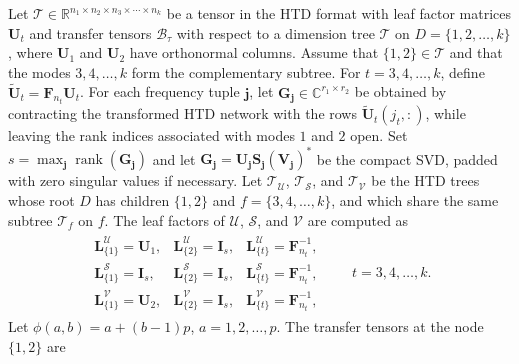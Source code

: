 \documentclass[onefignum,onetabnum]{siamart250211}
\begin{document}
\begin{proposition}
\label{thm:htd_kth_tsvd_core}
Let $\mathscr{T}\in\mathbb{R}^{n_1\times n_2\times n_3\times\cdots\times n_k}$ be a tensor in the HTD format with leaf factor matrices $\textbf{U}_t$ and
transfer tensors $\mathscr{B}_\tau$ with respect to a dimension tree
$\mathcal{T}$ on $D=\{1,2, \dots,k\}$, where $\textbf{U}_1$ and
$\textbf{U}_2$ have orthonormal columns. Assume that $\{1,2\}\in\mathcal{T}$ and that the modes $3, 4, \dots,k$ form the complementary subtree. For $t=3, 4, \dots,k$, define
$\widetilde{\textbf{U}}_t=\textbf{F}_{n_t}\textbf{U}_t$. For each frequency tuple
$\boldsymbol{j}$, let
$\textbf{G}_{\boldsymbol{j}}\in\mathbb{C}^{r_1\times r_2}$ be obtained by
contracting the transformed HTD network with the rows
$\widetilde{\textbf{U}}_t(j_t,:)$, while leaving the rank
indices associated with modes $1$ and $2$ open. Set
$s=\max_{\boldsymbol{j}}\operatorname{rank}(\textbf{G}_{\boldsymbol{j}})$ and let $\textbf{G}_{\boldsymbol{j}}
=
\textbf{U}_{\boldsymbol{j}}
\boldsymbol{S}_{\boldsymbol{j}}
(\textbf{V}_{\boldsymbol{j}})^*$
be the compact SVD, padded with zero singular values if necessary.
Let $\mathcal{T}_{\mathscr{U}}$, $\mathcal{T}_{\mathscr{S}}$, and
$\mathcal{T}_{\mathscr{V}}$ be the HTD trees whose root $D$ has children $\{1,2\}$ and $f=\{3,4,\dots,k\}$, and which share the same subtree $\mathcal{T}_f$ on $f$. The leaf factors of $\mathscr{U}$, $\mathscr{S}$, and
$\mathscr{V}$ are computed as
\begin{align*}
\begin{array}{lll}
\textbf{L}^{\mathscr{U}}_{\{1\}}=\textbf{U}_1, &
\textbf{L}^{\mathscr{U}}_{\{2\}}=\textbf{I}_s, &
\textbf{L}^{\mathscr{U}}_{\{t\}}=\textbf{F}_{n_t}^{-1}, \\
\textbf{L}^{\mathscr{S}}_{\{1\}}=\textbf{I}_s, &
\textbf{L}^{\mathscr{S}}_{\{2\}}=\textbf{I}_s, &
\textbf{L}^{\mathscr{S}}_{\{t\}}=\textbf{F}_{n_t}^{-1}, \\
\textbf{L}^{\mathscr{V}}_{\{1\}}=\textbf{U}_2, &
\textbf{L}^{\mathscr{V}}_{\{2\}}=\textbf{I}_s, &
\textbf{L}^{\mathscr{V}}_{\{t\}}=\textbf{F}_{n_t}^{-1},
\end{array}
\qquad t=3, 4, \dots,k.
\end{align*}
Let $\phi(a,b)=a+(b-1)p$, $a = 1,2,\dots,p$. The transfer tensors at the node $\{1,2\}$ are

\end{proposition}
\end{document}

